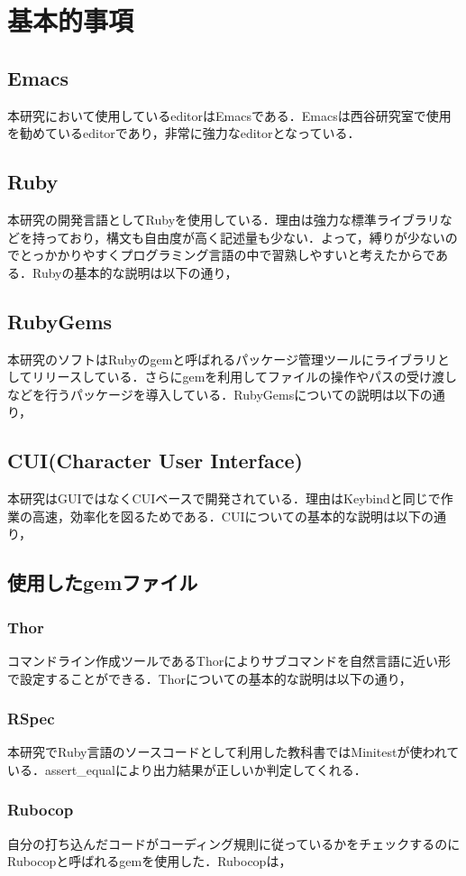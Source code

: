 \chapter{基本的事項}\label{ux57faux672cux7684ux4e8bux9805}

\section{Emacs}\label{emacs}
本研究において使用しているeditorはEmacsである．Emacsは西谷研究室で使用を勧めているeditorであり，非常に強力なeditorとなっている．

\section{Ruby}\label{ruby}
本研究の開発言語としてRubyを使用している．理由は強力な標準ライブラリなどを持っており，構文も自由度が高く記述量も少ない．よって，縛りが少ないのでとっかかりやすくプログラミング言語の中で習熟しやすいと考えたからである．Rubyの基本的な説明は以下の通り，

\section{RubyGems}\label{rubygems}
本研究のソフトはRubyのgemと呼ばれるパッケージ管理ツールにライブラリとしてリリースしている．さらにgemを利用してファイルの操作やパスの受け渡しなどを行うパッケージを導入している．RubyGemsについての説明は以下の通り，

\section{CUI(Character User Interface)}\label{cui}
本研究はGUIではなくCUIベースで開発されている．理由はKeybindと同じで作業の高速，効率化を図るためである．CUIについての基本的な説明は以下の通り，

\section{使用したgemファイル}\label{ux4f7fux7528ux3057ux305fgemux30d5ux30a1ux30a4ux30eb}

\subsection{Thor}\label{thor}
コマンドライン作成ツールであるThorによりサブコマンドを自然言語に近い形で設定することができる．Thorについての基本的な説明は以下の通り，

\subsection{RSpec}\label{rspec}
本研究でRuby言語のソースコードとして利用した教科書ではMinitestが使われている．assert\_equalにより出力結果が正しいか判定してくれる．

\subsection{Rubocop}\label{rubocop}
自分の打ち込んだコードがコーディング規則に従っているかをチェックするのにRubocopと呼ばれるgemを使用した．Rubocopは，
